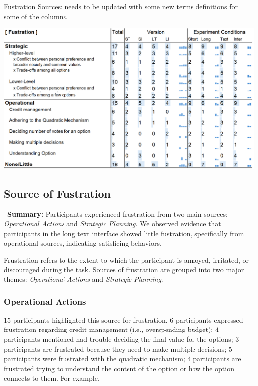 \begin{table}[h]
    \caption{Fustration Sources: needs to be updated with some new terms definitions for some of the columns.}
    \label{tbl:fustration}
    \includegraphics[width=\linewidth]{content/image/cog/fustration_table.png}
\end{table}
\subsection{Source of Fustration} 
\label{sec:fustration}

\vspace{5pt}
\begin{tldrbox}
    \faInfoCircle~\xspace\textbf{Summary:} Participants experienced frustration from two main sources: \textit{Operational Actions} and \textit{Strategic Planning}. We observed evidence that participants in the long text interface showed little fustration, specifically from operational sources, indicating satisficing behaviors.
\end{tldrbox}

Frustration refers to the extent to which the participant is annoyed, irritated, or discouraged during the task. Sources of frustration are grouped into two major themes: \textit{Operational Actions} and \textit{Strategic Planning}.

\subsubsection{Operational Actions} 
$15$ participants highlighted this source for frustration. $6$ participants expressed frustration regarding credit management (i.e., overspending budget); $4$ participants mentioned had trouble deciding the final value for the options; $3$ participants are frustrated because they need to make multiple decisions; $5$ participants were frustrated with the quadratic mechanism; $4$ participants are frustrated trying to understand the content of the option or how the option connects to them. For example, 

